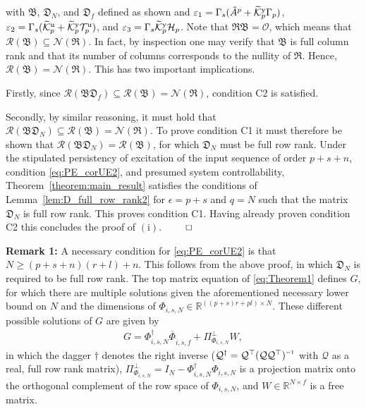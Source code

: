 with $\mathfrak{B}$, $\mathfrak{D}_N$, and $\mathfrak{D}_f$ defined as shown and $\varepsilon_1=\Gamma_s(\tilde{A}^p+\widetilde{\mathcal{K}}_{p}^{\mathrm{{y}}}\Gamma_p)$, $\varepsilon_2=\Gamma_s(\widetilde{\mathcal{K}}_{p}^{\mathrm{{u}}}+\widetilde{\mathcal{K}}_{p}^{\mathrm{{y}}}\mathcal{T}_p^\mathrm{u})$, and $\varepsilon_3=\Gamma_s\widetilde{\mathcal{K}}_{p}^{\mathrm{{y}}}\mathcal{H}_p$. Note that $\mathfrak{RB}=\mathcal{O}$, which means that $\mathcal{R}(\mathfrak{B})\subseteq\mathcal{N}(\mathfrak{R})$. In fact, by inspection one may verify that $\mathfrak{B}$ is full column rank and that its number of columns corresponds to the nullity of $\mathfrak{R}$. Hence, $\mathcal{R}(\mathfrak{B})=\mathcal{N}(\mathfrak{R})$. This has two important implications.

Firstly, since ${\mathcal{R}(\mathfrak{BD}_f)\subseteq\mathcal{R}(\mathfrak{B})=\mathcal{N}(\mathfrak{R})}$, condition C2 is satisfied.

Secondly, by similar reasoning, it must hold that ${\mathcal{R}(\mathfrak{BD}_N)\subseteq\mathcal{R}(\mathfrak{B})=\mathcal{N}(\mathfrak{R})}$. To prove condition C1 it must therefore be shown that $\mathcal{R}(\mathfrak{BD}_N)=\mathcal{R}(\mathfrak{B})$, for which $\mathfrak{D}_N$ must be full row rank. Under the stipulated persistency of excitation of the input sequence of order $p+s+n$, condition \eqref{eq:PE_corUE2}, and presumed system controllability, Theorem~\ref{theorem:main_result} satisfies the conditions of Lemma~\ref{lem:D_full_row_rank2} for $\epsilon=p+s$ and $q=N$ such that the matrix $\mathfrak{D}_N$ is full row rank. This proves condition C1. Having already proven condition C2 this concludes the proof of $\mathrm{(i)}$. $\hfill\qed$

\noindent\textbf{Remark 1:} A necessary condition for \eqref{eq:PE_corUE2} is that ${N\geq(p+s+n)(r+l)+n}$. This follows from the above proof, in which $\mathfrak{D}_N$ is required to be full row rank. The top matrix equation of \eqref{eq:Theorem1} defines $G$, for which there are multiple solutions given the aforementioned necessary lower bound on $N$ and the dimensions of $\Phi_{i,s,N}\in\mathbb{R}^{((p+s)r+pl)\times N}$. These different possible solutions of $G$ are given by
\begin{align}%
    G = \Phi_{i,s,N}^\dagger\overline{\Phi}_{\hat{i},s,f} + \Pi_{\Phi_{i,s,N}}^\bot W,
\end{align}
in which the dagger $\dagger$ denotes the right inverse ($\mathcal{Q}^\dagger=\mathcal{Q}^\top(\mathcal{Q}\mathcal{Q}^\top)\inv$ with $\mathcal{Q}$ as a real, full row rank matrix), $\Pi_{\Phi_{i,s,N}}^\bot=I_N-\Phi_{i,s,N}^\dagger\Phi_{i,s,N}$ is a projection matrix onto the orthogonal complement of the row space of $\Phi_{i,s,N}$, %
and $W\in\mathbb{R}^{N\times f}$ is a free matrix.

